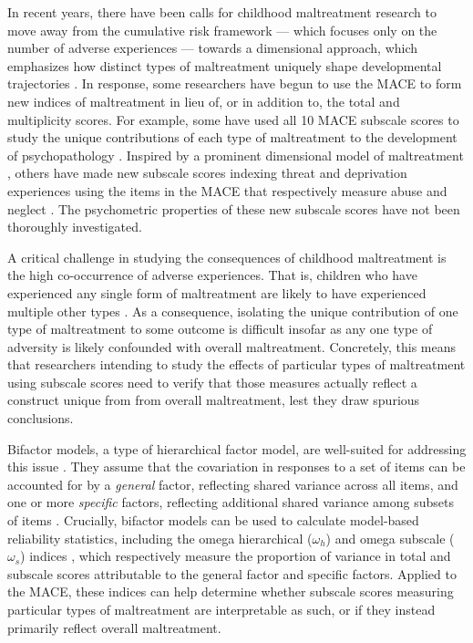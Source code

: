 \documentclass[letterpaper,man,natbib,floatsintext,longtable]{apa6}
\begin{document}
In recent years, there have been calls for childhood maltreatment research to move away from the cumulative risk framework \citep{evans2013cumulative} --- which focuses only on the number of adverse experiences --- towards a dimensional approach, which emphasizes how distinct types of maltreatment uniquely shape developmental trajectories \citep{mclaughlin2016beyond, belsky2012beyond}. In response, some researchers have begun to use the MACE to form new indices of maltreatment in lieu of, or in addition to, the total and multiplicity scores. For example, some have used all 10 MACE subscale scores to study the unique contributions of each type of maltreatment to the development of psychopathology \citep{schalinski2015type, gerke2018childhood, schalinski2019early}. Inspired by a prominent dimensional model of maltreatment \citep{mclaughlin2014childhood}, others have made new subscale scores indexing threat and deprivation experiences using the items in the MACE that respectively measure abuse and neglect \citep{schalinski2018defining, schalinski2019environmental, teicher2018differential}. The psychometric properties of these new subscale scores have not been thoroughly investigated.   

A critical challenge in studying the consequences of childhood maltreatment is the high co-occurrence of adverse experiences. That is, children who have experienced any single form of maltreatment are likely to have experienced multiple other types \citep{dong2004interrelatedness, herrenkohl2009assessing, kessler2010childhood}. As a consequence, isolating the unique contribution of one type of maltreatment to some outcome is difficult insofar as any one type of adversity is likely confounded with overall maltreatment. Concretely, this means that researchers intending to study the effects of particular types of maltreatment using subscale scores need to verify that those measures actually reflect a construct unique from from overall maltreatment, lest they draw spurious conclusions.

Bifactor models, a type of hierarchical factor model, are well-suited for addressing this issue \citep{bornovalova2020appropriate}. They assume that the covariation in responses to a set of items can be accounted for by a \emph{general} factor, reflecting shared variance across all items, and one or more \emph{specific} factors, reflecting additional shared variance among subsets of items \citep{Reise2012-ql}. Crucially, bifactor models can be used to calculate model-based reliability statistics, including the omega hierarchical ($\omega_h$) and omega subscale ($\omega_s$) indices \citep{reise2013scoring}, which respectively measure the proportion of variance in total and subscale scores attributable to the general factor and specific factors. Applied to the MACE, these indices can help determine whether subscale scores measuring particular types of maltreatment are interpretable as such, or if they instead primarily reflect overall maltreatment. 
\end{document}
